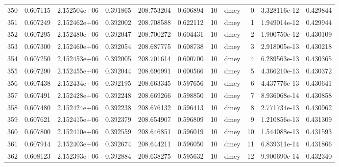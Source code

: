 \begin{tabular}{lrrrrrrlrrr}
350  &    0.607115 &        2.152504e+06 &  0.391865 &              208.753204 &    0.606894 &      10 &         dmey &      0 &   3.328116e-12 &      0.429844 \\
351  &    0.607249 &        2.152462e+06 &  0.392002 &              208.708588 &    0.622112 &      10 &         dmey &      1 &   1.949014e-12 &      0.429944 \\
352  &    0.607295 &        2.152480e+06 &  0.392047 &              208.700272 &    0.604431 &      10 &         dmey &      2 &   1.900750e-12 &      0.430109 \\
353  &    0.607300 &        2.152460e+06 &  0.392054 &              208.687775 &    0.608738 &      10 &         dmey &      3 &   2.918005e-13 &      0.430218 \\
354  &    0.607250 &        2.152453e+06 &  0.392005 &              208.701614 &    0.600700 &      10 &         dmey &      4 &   6.289563e-13 &      0.430365 \\
355  &    0.607290 &        2.152455e+06 &  0.392044 &              208.696991 &    0.600566 &      10 &         dmey &      5 &   4.366210e-13 &      0.430372 \\
356  &    0.607438 &        2.152434e+06 &  0.392195 &              208.663345 &    0.597656 &      10 &         dmey &      6 &   4.437776e-13 &      0.430641 \\
357  &    0.607491 &        2.152428e+06 &  0.392248 &              208.669266 &    0.598850 &      10 &         dmey &      7 &   8.936068e-14 &      0.430858 \\
358  &    0.607480 &        2.152424e+06 &  0.392238 &              208.676132 &    0.596413 &      10 &         dmey &      8 &   2.771734e-13 &      0.430962 \\
359  &    0.607621 &        2.152415e+06 &  0.392379 &              208.654907 &    0.596809 &      10 &         dmey &      9 &   1.210856e-13 &      0.431309 \\
360  &    0.607800 &        2.152410e+06 &  0.392559 &              208.646851 &    0.596019 &      10 &         dmey &     10 &   1.544088e-13 &      0.431593 \\
361  &    0.607914 &        2.152403e+06 &  0.392674 &              208.644211 &    0.596050 &      10 &         dmey &     11 &   6.839311e-14 &      0.431866 \\
362  &    0.608123 &        2.152393e+06 &  0.392884 &              208.638275 &    0.595632 &      10 &         dmey &     12 &   9.900690e-14 &      0.432340 \\

\end{tabular}

